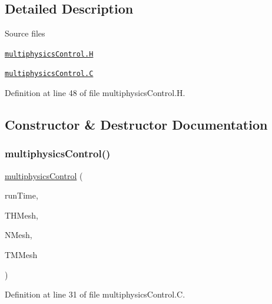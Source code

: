 \subsection{Detailed Description}
\begin{DoxyParagraph}{Source files}

\begin{DoxyItemize}
\item \href{../../../home/carlo/data/GeN-Foam/GeN-Foam_ffn/GeN-Foam/GeN-Foam/classes/multiphysicsControl/multiphysicsControl.H}{\tt multiphysics\+Control.\+H} 
\item \href{../../../home/carlo/data/GeN-Foam/GeN-Foam_ffn/GeN-Foam/GeN-Foam/classes/multiphysicsControl/multiphysicsControl.C}{\tt multiphysics\+Control.\+C} 
\end{DoxyItemize}
\end{DoxyParagraph}


Definition at line 48 of file multiphysics\+Control.\+H.



\subsection{Constructor \& Destructor Documentation}
\mbox{\label{classFoam_1_1multiphysicsControl_a516f632110c1526d2feb7ad4aa5f96cb}} 
\subsubsection{\texorpdfstring{multiphysics\+Control()}{multiphysicsControl()}}
{\footnotesize\ttfamily \hyperlink{classFoam_1_1multiphysicsControl}{multiphysics\+Control} (\begin{DoxyParamCaption}\item[{const Time \&}]{run\+Time,  }\item[{fv\+Mesh \&}]{T\+H\+Mesh,  }\item[{fv\+Mesh \&}]{N\+Mesh,  }\item[{fv\+Mesh \&}]{T\+M\+Mesh }\end{DoxyParamCaption})}



Definition at line 31 of file multiphysics\+Control.\+C.

